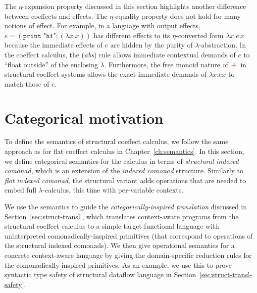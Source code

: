 \noindent
The $\eta$-expansion property discussed in this section highlights another difference
between coeffects and effects. The $\eta$-equality property does not hold for many notions
of effect. For example, in a language with output effects, $e = (\texttt{print "hi"}; (\lambda x . x))$
has different effects to its $\eta$-converted form $\lambda x . e\,x$ because the immediate
effects of $e$ are hidden by the purity of $\lambda$-abstraction. In the coeffect calculus,
the (\emph{abs}) rule allows immediate contextual demands of $e$ to ``float outside''
of the enclosing $\lambda$. Furthermore, the free monoid nature of $\atimes$ in structural
coeffect systems allows the exact immediate demands of $\lambda x . e x$ to match
those of $e$.



%
%

\section{Categorical motivation}
\label{sec:struct-semantics}

To define the semantics of structural coeffect calculus, we follow the same approach as for flat
coeffect calculus in Chapter~\ref{ch:semantics}. In this section, we define categorical semantics
for the calculus in terms of \emph{structural indexed comonad}, which is an extension of the
\emph{indexed comonad} structure. Similarly to \emph{flat indexed comonad}, the structural variant
adds operations that are needed to embed full $\lambda$-calculus, this time with per-variable contexts.

We use the semantics to guide the \emph{categorically-inspired translation} discussed in
Section~\ref{sec:struct-transl}, which translates context-aware programs from the structural coeffect
calculus to a simple target functional language with uninterpreted comonadically-inspired primitives
(that correspond to operations of the structural indexed comonads). We then give operational
semantics for a concrete context-aware language by giving the domain-specific reduction rules for
the comonadically-inspired primitives. As an example, we use this to prove syntactic type safety
of structural dataflow language in Section~\ref{sec:struct-transl-safety}.

